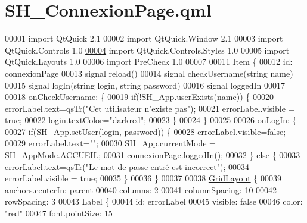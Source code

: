 \hypertarget{SH__ConnexionPage_8qml}{\section{S\-H\-\_\-\-Connexion\-Page.\-qml}
\label{SH__ConnexionPage_8qml}
}

\begin{DoxyCode}
00001 \textcolor{keyword}{import} QtQuick 2.1
00002 import QtQuick.Window 2.1
00003 import QtQuick.Controls 1.0
\hypertarget{SH__ConnexionPage_8qml_source_l00004}{}\hyperlink{classSH__ConnexionPage}{00004} import QtQuick.Controls.Styles 1.0
00005 import QtQuick.Layouts 1.0
00006 import PreCheck 1.0
00007 
00011 Item \{
00012     \textcolor{keywordtype}{id}: connexionPage
00013     signal reload()
00014     signal checkUsername(\textcolor{keywordtype}{string} name)
00015     signal logIn(\textcolor{keywordtype}{string} login, \textcolor{keywordtype}{string} password)
00016     signal loggedIn
00017 
00018     onCheckUsername: \{
00019         \textcolor{keywordflow}{if}(!SH\_App.userExists(name)) \{
00020             errorLabel.text=qsTr(\textcolor{stringliteral}{"Cet utilisateur n'existe pas"});
00021             errorLabel.visible = \textcolor{keyword}{true};
00022             login.textColor=\textcolor{stringliteral}{"darkred"};
00023         \}
00024     \}
00025 
00026     onLogIn: \{
00027         \textcolor{keywordflow}{if}(SH\_App.setUser(login, password)) \{
00028             errorLabel.visible=\textcolor{keyword}{false};
00029             errorLabel.text=\textcolor{stringliteral}{""};
00030             SH\_App.currentMode = SH\_AppMode.ACCUEIL;
00031             connexionPage.loggedIn();
00032         \} \textcolor{keywordflow}{else} \{
00033             errorLabel.text=qsTr(\textcolor{stringliteral}{"Le mot de passe entré est incorrect"});
00034             errorLabel.visible = \textcolor{keyword}{true};
00035         \}
00036     \}
00037 
00038     \hyperlink{classGridLayout}{GridLayout} \{
00039         anchors.centerIn: parent
00040         columns: 2
00041         columnSpacing: 10
00042         rowSpacing: 3
00043         Label \{
00044             \textcolor{keywordtype}{id}: errorLabel
00045             visible: \textcolor{keyword}{false}
00046             color: \textcolor{stringliteral}{"red"}
00047             font.pointSize: 15

\end{DoxyCode}
